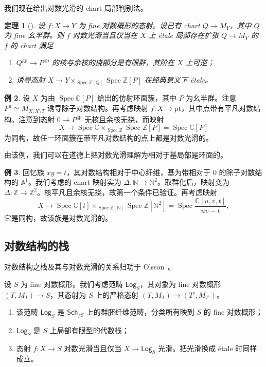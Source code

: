 \documentclass{amsart}
\newtheorem{thm}{定理}[section]
\theoremstyle{definition}
\newtheorem{exm}[thm]{例}
\theoremstyle{remark}
\theoremstyle{plain}
\theoremstyle{definition}
\theoremstyle{remark}
\newcommand{\A}{\mathbb{A}}
\newcommand{\N}{\mathbb{N}}
\newcommand{\C}{\mathbb{C}}
\newcommand{\Z}{\mathbb{Z}}
\newcommand{\mr}[1]{\mathrm{#1}}
\newcommand{\ms}[1]{\mathsf{#1}}
\newcommand{\ul}[1]{\underline{#1}}
\newcommand{\1}{\mathbf{1}}
\newcommand{\2}{\mathbf{2}}
\newcommand{\3}{\mathbf{3}}
\DeclareMathOperator{\Spec}{Spec}
\begin{document}
我们现在给出对数光滑的 chart 局部判别法。

\begin{thm}[{\cite[Theorem~3.5]{Kato1989}}]
    设 \(f \colon X \to Y\) 为 fine 对数概形的态射。设已有 chart \(Q \to M_Y\)，其中 \(Q\) 为 fine 幺半群。则 \(f\) 对数光滑当且仅当在 \(X\) 上 \'etale 局部存在扩张 \(Q \to M_Y\) 的 \(f\) 的 chart 满足
    \begin{enumerate}
        \item \(Q^{\mr{gp}} \to P^{\mr{gp}}\) 的核与余核的挠部分是有限群，其阶在 \(X\) 上可逆；
        \item 诱导态射 \(\ul{X} \to \ul{Y} \times_{\Spec \Z[Q]} \Spec \Z[P]\) 在经典意义下 \'etale。
    \end{enumerate}
\end{thm}

\begin{exm}
    设 \(X\) 为由 \(\Spec \C[P]\) 给出的仿射环面簇，其中 \(P\) 为幺半群。注意 \(P^a \simeq M_{X, X \setminus T}\) 诱导除子对数结构。再考虑映射 \(f \colon X \to \mr{pt}\)，其中点带有平凡对数结构。注意到态射 \(0 \to P^{\mr{gp}}\) 无核且余核无挠，而映射
    \[ \ul{X} \to \Spec \C \times_{\Spec \Z} \Spec \Z[P] = \Spec \C[P] \]
    为同构，故任一环面簇在带平凡对数结构的点上都是对数光滑的。
\end{exm}

由该例，我们可以在道德上把对数光滑理解为相对于基局部是环面的。

\begin{exm}
    回忆族 \(xy = t\)，其对数结构相对于中心纤维，基为带相对于 \(0\) 的除子对数结构的 \(\A^1\)。我们考虑的 chart 映射实为 \(\Delta \colon \N \to \N^2\)。取群化后，映射变为 \(\Delta \colon \Z \to \Z^2\)。核平凡且余核无挠，故第一个条件已验证。再考虑映射
    \[ \ul{X} \to \Spec \C[t] \times_{\Spec \Z[\N]} \Spec \Z[\N^2] = \Spec \frac{\C[u,v,t]}{uv-t}, \]
    它是同构，故该族是对数光滑的。
\end{exm}

\subsection{对数结构的栈}%
\label{sub:Stack of log structures}

对数结构之栈及其与对数光滑的关系归功于 Olsson~\cite{Olsson2003}。

设 \(S\) 为 fine 对数概形。我们考虑范畴 \(\ms{Log}_S\)，其对象为 fine 对数概形 \((T, M_T) \to S\)，其态射为 \(S\) 上的严格态射 \((T, M_T) \to (T', M_{T'})\)。
\begin{enumerate}
    \item 该范畴 \(\ms{Log}_S\) 是 \(\ms{Sch}_{/S}\) 上的群胚纤维范畴，分类所有映到 \(S\) 的 fine 对数概形；
    \item \(\ms{Log}_S\) 是 \(S\) 上局部有限型的代数栈；
    \item 态射 \(f \colon X \to S\) 对数光滑当且仅当 \(X \to \ms{Log}_S\) 光滑。把光滑换成 \'etale 时同样成立。
\end{enumerate}
\end{document}
